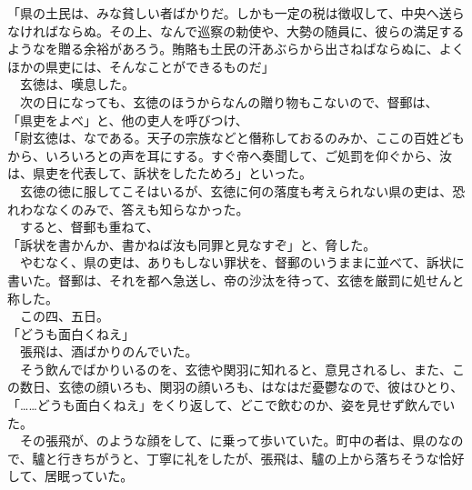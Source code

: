\documentclass[
  paper=a5,
  fontsize=10pt,
  jafontsize=9.5pt,
  tate,                  %
  open_bracket_pos=nibu, %
]{jlreq}
\begin{document}
「県の土民は、みな貧しい者ばかりだ。しかも一定の税は徴収して、中央へ送らなければならぬ。その上、なんで巡察の勅使や、大勢の随員に、彼らの満足するようなを贈る余裕があろう。賄賂も土民の汗あぶらから出さねばならぬに、よくほかの県吏には、そんなことができるものだ」\\


　玄徳は、嘆息した。\\


　次の日になっても、玄徳のほうからなんの贈り物もこないので、督郵は、\\


「県吏をよべ」と、他の吏人を呼びつけ、\\


「尉玄徳は、なである。天子の宗族などと僭称しておるのみか、ここの百姓どもから、いろいろとの声を耳にする。すぐ帝へ奏聞して、ご処罰を仰ぐから、汝は、県吏を代表して、訴状をしたためろ」といった。\\


　玄徳の徳に服してこそはいるが、玄徳に何の落度も考えられない県の吏は、恐れわななくのみで、答えも知らなかった。\\


　すると、督郵も重ねて、\\


「訴状を書かんか、書かねば汝も同罪と見なすぞ」と、脅した。\\


　やむなく、県の吏は、ありもしない罪状を、督郵のいうままに並べて、訴状に書いた。督郵は、それを都へ急送し、帝の沙汰を待って、玄徳を厳罰に処せんと称した。\\


　この四、五日。\\


「どうも面白くねえ」\\


　張飛は、酒ばかりのんでいた。\\


　そう飲んでばかりいるのを、玄徳や関羽に知れると、意見されるし、また、この数日、玄徳の顔いろも、関羽の顔いろも、はなはだ憂鬱なので、彼はひとり、\\


「……どうも面白くねえ」をくり返して、どこで飲むのか、姿を見せず飲んでいた。\\


　その張飛が、のような顔をして、に乗って歩いていた。町中の者は、県のなので、驢と行きちがうと、丁寧に礼をしたが、張飛は、驢の上から落ちそうな恰好して、居眠っていた。\\
\end{document}

